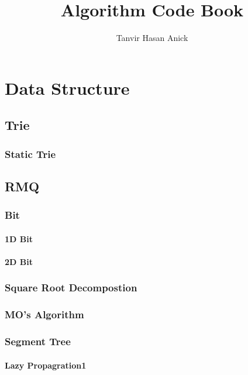 \documentclass[1pt]{report}
\title{Algorithm Code Book}
\author{Tanvir Hasan Anick}
\begin{document}
\maketitle
\tableofcontents
\newpage

\chapter{Data Structure}
\section{Trie}
\subsection{Static Trie}

\section{RMQ}
\subsection{Bit}
\subsubsection{1D Bit}

\subsubsection{2D Bit}

\subsection{Square Root Decompostion}

\subsection{MO's Algorithm}

\subsection{Segment Tree}
\subsubsection{Lazy Propagration1}

\end{document}
